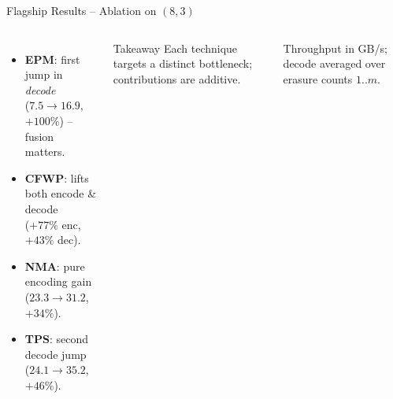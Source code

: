 \documentclass[aspectratio=169]{beamer}
\begin{document}
\begin{frame}[t]{Flagship Results -- Ablation on $(8,3)$}
\footnotesize
\begin{columns}[T,totalwidth=\textwidth]
  \begin{itemize}
    \setlength{\itemsep}{0.45em}
    \item \textbf{EPM}: first jump in \emph{decode} \\ \small ($7.5 \to 16.9$, $+100\%$) -- fusion matters.
    \item \textbf{CFWP}: lifts both encode \& decode \\ \small ($+77\%$ enc, $+43\%$ dec).
    \item \textbf{NMA}: pure encoding gain \\ \small ($23.3 \to 31.2$, $+34\%$).
    \item \textbf{TPS}: second decode jump \\ \small ($24.1 \to 35.2$, $+46\%$).
  \end{itemize}

  \vspace{0.5em}
  \begin{block}{Takeaway}
  \small Each technique targets a distinct bottleneck; contributions are additive.
  \end{block}

  \centering

  \vspace{0.4em}
  {\scriptsize Throughput in GB/s; decode averaged over erasure counts $1..m$.}
\end{columns}
\end{frame}
\end{document}
